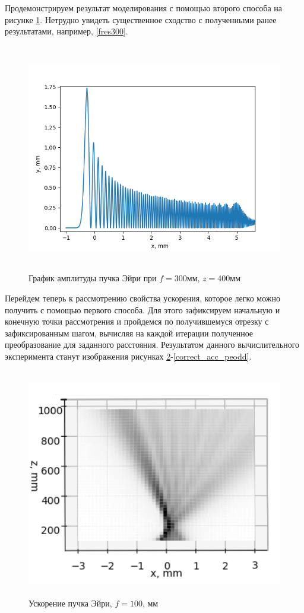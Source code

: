 {	Продемонстрируем результат моделирования с помощью второго способа на рисунке \ref{four_fres_300_400}. Нетрудно увидеть существенное сходство с полученными ранее результатами, например, 	\ref{fres300}.
		\begin{figure}[H]
	\centering
\includegraphics[height = 10cm]{plots/four_fres_300_400.png}
\caption{График амплитуды пучка Эйри при $f = 300$мм, $z = 400$мм}
	\label{four_fres_300_400}
\end{figure}

	Перейдем теперь к рассмотрению свойства ускорения, которое легко можно получить с помощью первого способа. Для этого зафиксируем начальную и конечную точки рассмотрения и пройдемся по получившемуся отрезку с зафиксированным шагом, вычисляя на каждой итерации полученное преобразование для заданного расстояния. Результатом данного вычислительного эксперимента станут изображения  рисунках \ref{correct_acc}-\ref{correct_acc_peodd}.
	\begin{figure}[H]
	\centering
\includegraphics[height = 10cm]{plots/ai_acc_before_focus.png}
\caption{Ускорение пучка Эйри, $f = 100$, мм}
	\label{correct_acc}
\end{figure}
	
}
